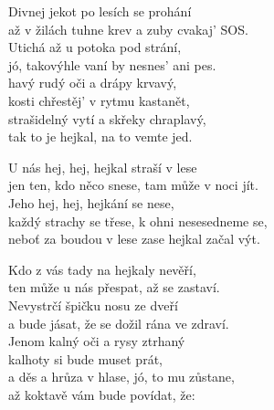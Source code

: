 
\ve{}
Divnej jekot po lesích se prohání\\
až v žilách tuhne krev a zuby cvakaj' SOS.\\
Utichá až u potoka pod strání,\\
jó, takovýhle vaní by nesnes' ani pes.\\
havý rudý oči a drápy krvavý,\\
kosti chřestěj' v rytmu kastanět,\\
strašidelný vytí a skřeky chraplavý,\\
tak to je hejkal, na to vemte jed.
 
\cho{}
U nás hej, hej, hejkal straší v lese\\
jen ten, kdo něco snese, tam může v noci jít.\\
Jeho hej, hej, hejkání se nese,\\
každý strachy se třese, k ohni nesesedneme se,\\
neboť za boudou v lese zase hejkal začal výt.

\ve{}
Kdo z vás tady na hejkaly nevěří,\\
ten může u nás přespat, až se zastaví.\\
Nevystrčí špičku nosu ze dveří\\
a bude jásat, že se dožil rána ve zdraví.\\
Jenom kalný oči a rysy ztrhaný\\
kalhoty si bude muset prát,\\
a děs a hrůza v hlase, jó, to mu zůstane,\\
až koktavě vám bude povídat, že:

\cho{}

\esong
